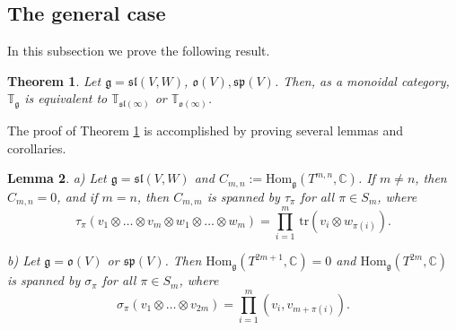 \documentclass[10pt]{amsart}
\newcounter{theorem}
\newtheorem{theo}{Theorem}[section]
\newtheorem{lemma}[theo]{Lemma}
\renewenvironment{proof}{ \emph{Proof}}{$\Box$}
\newcommand {\ZZ} {\mathbb {Z}}
\newcommand {\CC} {\mathbb {C}}
\newcommand{\TT}{\mathbb{T}}
\renewcommand{\sp}{\mathfrak{sp}}
\renewcommand{\sl}{\mathfrak{sl}}
\newcommand{\oo}{\mathfrak{o}}
\newcommand{\hh}{\mathfrak{h}}
\renewcommand{\gg}{\mathfrak{g}}
\renewcommand {\phi} {\varphi}
\newcommand{\tr}{\mathrm{tr}}
\newcommand{\Hom}{\mathrm{Hom}}
\begin{document}
% 
% 

\subsection{The general case}\label{sect:5.2}
In this subsection we prove the following result.
\begin{theo}\label{equivmain} 
Let $\gg=\sl(V,W)$, $\oo(V), \sp(V)$. Then, as a monoidal category, $\TT_\gg$ is equivalent to $\TT_{\sl(\infty)}$ or  $\TT_{\oo(\infty)}$.
\end{theo}

The proof of Theorem \ref{equivmain} is accomplished by proving several lemmas and corollaries. 

\begin{lemma}\label{inv1} 
a) Let $\gg=\sl(V,W)$ and $C_{m,n}:=\Hom_\gg(T^{m,n},\CC)$. If $m\neq n$, then $C_{m,n}=0$, and if $m=n$, then
$C_{m,m}$ is spanned by $\tau_\pi$ for all $\pi\in S_m$, where
$$\tau_\pi(v_1\otimes\dots\otimes v_m\otimes w_1\otimes \dots\otimes w_m)=\prod_{i=1}^m\,\tr(v_i\otimes w_{\pi(i)}).$$

b) Let  $\gg=\oo(V)$ or $\sp(V)$. Then $\Hom_\gg(T^{2m+1},\CC)=0$  and $\Hom_\gg(T^{2m},\CC)$ is spanned by
$\sigma_\pi$  for all $\pi\in S_m$, where
$$\sigma_\pi(v_1\otimes\dots\otimes v_{2m})=\prod_{i=1}^m(v_i,v_{m+\pi(i)}).$$
\end{lemma}
\end{document}
